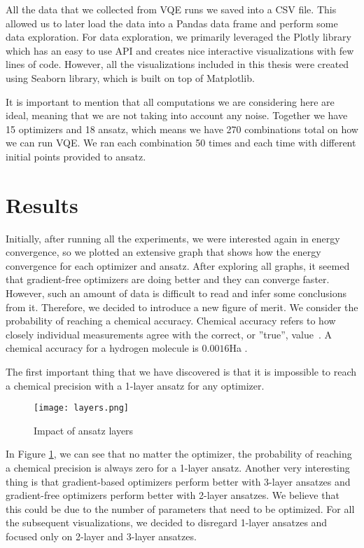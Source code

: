 All the data that we collected from VQE runs we saved into a CSV file. This allowed us to later load the data into a Pandas data frame and perform some data exploration. For data exploration, we primarily leveraged the Plotly library which has an easy to use API and creates nice interactive visualizations with few lines of code. However, all the visualizations included in this thesis were created using Seaborn library, which is built on top of Matplotlib.

It is important to mention that all computations we are considering here are ideal, meaning that we are not taking into account any noise. Together we have 15 optimizers and 18 ansatz, which means we have 270 combinations total on how we can run VQE. We ran each combination 50 times and each time with different initial points provided to ansatz. 

\section{Results} 
Initially, after running all the experiments, we were interested again in energy convergence, so we plotted an extensive graph that shows how the energy convergence for each optimizer and ansatz. After exploring all graphs, it seemed that gradient-free optimizers are doing better and they can converge faster. However, such an amount of data is difficult to read and infer some conclusions from it. Therefore, we decided to introduce a new figure of merit. We consider the probability of reaching a chemical accuracy. Chemical accuracy refers to how closely individual measurements agree with the correct, or ''true'', value~\cite{chemistry}. A chemical accuracy for a hydrogen molecule is $0.0016$Ha . 


The first important thing that we have discovered is that it is impossible to reach a chemical precision with a 1-layer ansatz for any optimizer.
\begin{figure}
    \centering
    \texttt{[image: layers.png]}
    \caption{Impact of ansatz layers}
    \label{fig:ansatz-layers}
\end{figure}

In Figure \ref{fig:ansatz-layers}, we can see that no matter the optimizer, the probability of reaching a chemical precision is always zero for a 1-layer ansatz. Another very interesting thing is that gradient-based optimizers perform better with 3-layer ansatzes and gradient-free optimizers perform better with 2-layer ansatzes. We believe that this could be due to the number of parameters that need to be optimized. For all the subsequent visualizations, we decided to disregard 1-layer ansatzes and focused only on 2-layer and 3-layer ansatzes.

